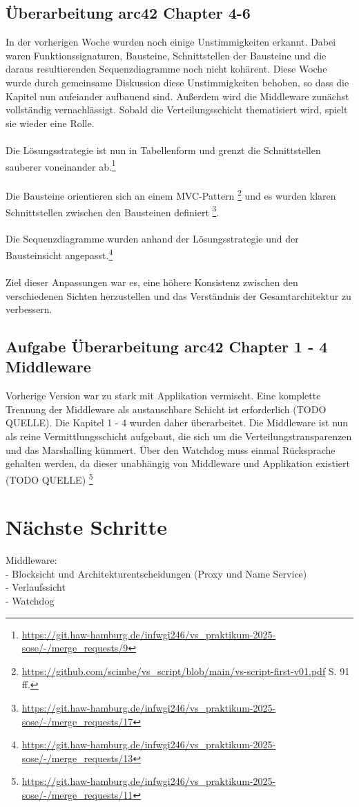 \documentclass{article}
\begin{document}
\subsection{Überarbeitung arc42 Chapter 4-6}
In der vorherigen Woche wurden noch einige Unstimmigkeiten erkannt. 
Dabei waren Funktionssignaturen, Bausteine, Schnittstellen der Bausteine und die daraus resultierenden Sequenzdiagramme noch nicht kohärent.
Diese Woche wurde durch gemeinsame Diskussion diese Unstimmigkeiten behoben, so dass die Kapitel nun aufeiander aufbauend sind. 
Außerdem wird die Middleware zunächst vollständig vernachlässigt. Sobald die Verteilungsschicht thematisiert wird, spielt sie wieder eine Rolle.
\\\\
Die Lösungsstrategie ist nun in Tabellenform und grenzt die Schnittstellen sauberer voneinander ab.\footnote{\url{https://git.haw-hamburg.de/infwgi246/vs_praktikum-2025-sose/-/merge_requests/9}}
\\\\
Die Bausteine orientieren sich an einem MVC-Pattern \footnote{\url{https://github.com/scimbe/vs_script/blob/main/vs-script-first-v01.pdf} S. 91 ff. } und es wurden klaren Schnittstellen zwischen den Bausteinen definiert \footnote{\url{https://git.haw-hamburg.de/infwgi246/vs_praktikum-2025-sose/-/merge_requests/17}}.
\\\\
Die Sequenzdiagramme wurden anhand der Lösungsstrategie und der Bausteinsicht angepasst.\footnote{\url{https://git.haw-hamburg.de/infwgi246/vs_praktikum-2025-sose/-/merge_requests/13}}\\\\
Ziel dieser Anpassungen war es, eine höhere Konsistenz zwischen den verschiedenen Sichten herzustellen und das Verständnis der Gesamtarchitektur zu verbessern.




\subsection{Aufgabe Überarbeitung arc42 Chapter 1 - 4 Middleware}
Vorherige Version war zu stark mit Applikation vermischt. Eine komplette Trennung der Middleware als austauschbare Schicht ist erforderlich (TODO QUELLE). 
Die Kapitel 1 - 4 wurden daher überarbeitet. 
Die Middleware ist nun als reine Vermittlungsschicht aufgebaut, die sich um die Verteilungstransparenzen und das Marshalling kümmert. 
Über den Watchdog muss einmal Rücksprache gehalten werden, da dieser unabhängig von Middleware und Applikation existiert (TODO QUELLE)
\footnote{\url{https://git.haw-hamburg.de/infwgi246/vs_praktikum-2025-sose/-/merge_requests/11}}






 
\section{Nächste Schritte}
Middleware:\\
- Blocksicht und Architekturentscheidungen (Proxy und Name Service)\\
- Verlaufssicht \\
- Watchdog \\
\end{document}
